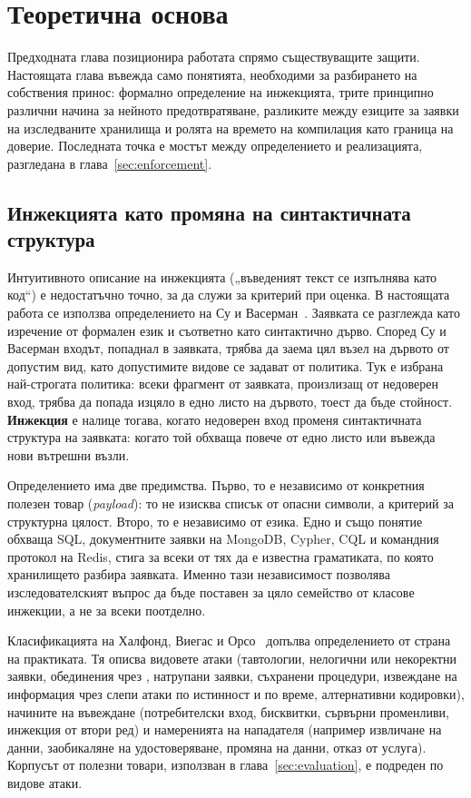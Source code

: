 \section{Теоретична основа}
\label{sec:theory}

Предходната глава позиционира работата спрямо съществуващите защити. Настоящата
глава въвежда само понятията, необходими за разбирането на собствения принос:
формално определение на инжекцията, трите принципно различни начина за нейното
предотвратяване, разликите между езиците за заявки на изследваните хранилища и
ролята на времето на компилация като граница на доверие. Последната точка е
мостът между определението и реализацията, разгледана в
глава~\ref{sec:enforcement}.

\subsection{Инжекцията като промяна на синтактичната структура}
\label{sec:theory-definition}

Интуитивното описание на инжекцията („въведеният текст се изпълнява като код“) е
недостатъчно точно, за да служи за критерий при оценка. В настоящата работа се
използва определението на Су и Васерман~\cite{su2006essence}. Заявката се
разглежда като изречение от формален език и съответно като синтактично дърво.
Според Су и Васерман входът, попаднал в заявката, трябва да заема цял възел на
дървото от допустим вид, като допустимите видове се задават от политика. Тук е
избрана най-строгата политика: всеки фрагмент от заявката, произлизащ от
недоверен вход, трябва да попада изцяло в едно листо на дървото, тоест да бъде
стойност. \textbf{Инжекция} е налице
тогава, когато недоверен вход променя синтактичната структура на заявката: когато
той обхваща повече от едно листо или въвежда нови вътрешни възли.

Определението има две предимства. Първо, то е независимо от конкретния полезен
товар (\textit{payload}): то не изисква списък от опасни символи, а критерий за
структурна цялост. Второ, то е независимо от езика. Едно и също понятие обхваща
SQL, документните заявки на MongoDB, Cypher, CQL и командния протокол на Redis,
стига за всеки от тях да е известна граматиката, по която хранилището разбира
заявката. Именно тази независимост позволява изследователският въпрос да бъде
поставен за цяло семейство от класове инжекции, а не за всеки поотделно.

Класификацията на Халфонд, Виегас и Орсо~\cite{halfond2006classification}
допълва определението от страна на практиката. Тя описва видовете атаки
(тавтологии, нелогични или некоректни заявки, обединения чрез ,
натрупани заявки, съхранени процедури, извеждане на информация чрез слепи атаки
по истинност и по време, алтернативни кодировки), начините на въвеждане
(потребителски вход, бисквитки, сървърни променливи, инжекция от втори ред) и
намеренията на нападателя (например извличане на данни, заобикаляне на
удостоверяване, промяна на данни, отказ от услуга). Корпусът от полезни товари,
използван в глава~\ref{sec:evaluation}, е подреден по видове атаки.

